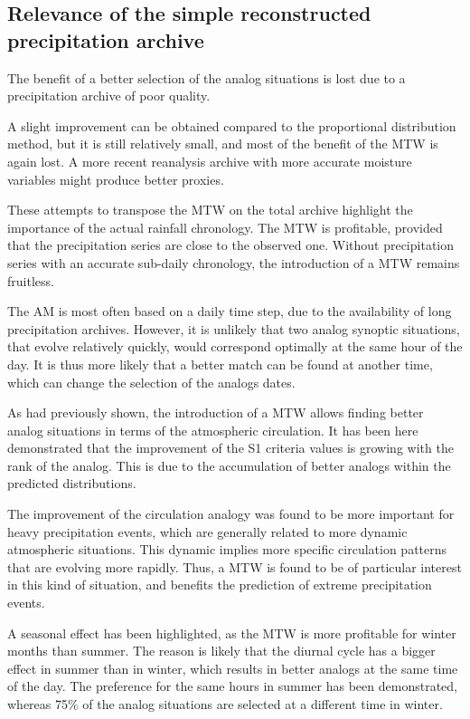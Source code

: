 \documentclass[hess, manuscript]{copernicus}
\begin{document}
\subsection{Relevance of the simple reconstructed precipitation archive}

The benefit of a better selection of the analog situations is lost due to a precipitation archive of poor quality.



A slight improvement can be obtained compared to the proportional distribution method, but it is still relatively small, and most of the benefit of the MTW is again lost. A more recent reanalysis archive with more accurate moisture variables might produce better proxies.

These attempts to transpose the MTW on the total archive highlight the importance of the actual rainfall chronology. The MTW is profitable, provided that the precipitation series are close to the observed one. Without precipitation series with an accurate sub-daily chronology, the introduction of a MTW remains fruitless.



\conclusions  %

The AM is most often based on a daily time step, due to the availability of long precipitation archives. However, it is unlikely that two analog synoptic situations, that evolve relatively quickly, would correspond optimally at the same hour of the day. It is thus more likely that a better match can be found at another time, which can change the selection of the analogs dates.

As \citet{Finet2008} had previously shown, the introduction of a MTW allows finding better analog situations in terms of the atmospheric circulation. It has been here demonstrated that the improvement of the S1 criteria values is growing with the rank of the analog. This is due to the accumulation of better analogs within the predicted distributions.

The improvement of the circulation analogy was found to be more important for heavy precipitation events, which are generally related to more dynamic atmospheric situations. This dynamic implies more specific circulation patterns that are evolving more rapidly. Thus, a MTW is found to be of particular interest in this kind of situation, and benefits the prediction of extreme precipitation events.

A seasonal effect has been highlighted, as the MTW is more profitable for winter months than summer. The reason is likely that the diurnal cycle has a bigger effect in summer than in winter, which results in better analogs at the same time of the day. The preference for the same hours in summer has been demonstrated, whereas 75\% of the analog situations are selected at a different time in winter.
\end{document}
